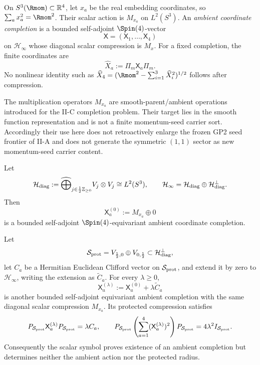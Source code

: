 \documentclass[12pt,a4paper]{article}
\begin{document}
\begin{definition}
\label{p2:def:xp-operators}
On \(S^3(\Rmom)\subset\mathbb R^4\), let \(x_a\) be the real embedding
coordinates, so \(\sum_a x_a^2=\Rmom^2\).  Their scalar action is
\(M_{x_a}\) on \(L^2(S^3)\).  An \emph{ambient coordinate completion} is a
bounded self-adjoint \(\Spin(4)\)-vector
\[
\mathsf X=(\mathsf X_1,\ldots,\mathsf X_4)
\]
on \(\mathcal H_\infty\) whose diagonal scalar compression is \(M_x\).
For a fixed completion, the finite coordinates are
\[
\widehat X_a:=\Pi_m\mathsf X_a\Pi_m.
\]
No nonlinear identity such as
\(\widehat X_4=(\Rmom^2-\sum_{i=1}^3\widehat X_i^2)^{1/2}\) follows after
compression.
\end{definition}

\begin{remark}
\label{p2c:rem:ambient-multiplication-seed-guard}
The multiplication operators \(M_{x_a}\) are smooth-parent/ambient operations
introduced for the II-C completion problem.  Their target lies in the smooth
function representation and is not a finite momentum-seed carrier sort.
Accordingly their use here does not retroactively enlarge the frozen GP2 seed
frontier of II-A and does not generate the symmetric \((1,1)\) sector as new
momentum-seed carrier content.
\end{remark}

\begin{proposition}
\label{p2:prop:ambient-completion-existence-nonuniqueness}
Let
\[
 \mathcal H_{\rm diag}
 :=
 \widehat{\bigoplus}_{j\in\frac12\mathbb Z_{\ge0}}
 V_j\otimes V_j
 \cong L^2(S^3),
 \qquad
 \mathcal H_\infty
 =
 \mathcal H_{\rm diag}\oplus\mathcal H_{\rm diag}^{\perp}.
\]
Then
\[
        \mathsf X_a^{(0)}:=M_{x_a}\oplus0
\]
is a bounded self-adjoint \(\Spin(4)\)-equivariant ambient coordinate
completion.

Let
\[
 \mathcal S_{\rm prot}
 =
 V_{\frac12,0}\oplus V_{0,\frac12}
 \subset\mathcal H_{\rm diag}^{\perp},
\]
let \(C_a\) be a Hermitian Euclidean Clifford vector on \(\mathcal S_{\rm prot}\), and
extend it by zero to \(\mathcal H_\infty\), writing the extension as
\(\widetilde C_a\).  For every \(\lambda\ge0\),
\[
        \mathsf X_a^{(\lambda)}
        :=
        \mathsf X_a^{(0)}+\lambda\widetilde C_a
\]
is another bounded self-adjoint equivariant ambient completion with the same
diagonal scalar compression \(M_{x_a}\).  Its protected compression satisfies
\[
 P_{\mathcal S_{\rm prot}}\mathsf X_a^{(\lambda)}P_{\mathcal S_{\rm prot}}
 =\lambda C_a,
 \qquad
 P_{\mathcal S_{\rm prot}}
 \left(\sum_{a=1}^4(\mathsf X_a^{(\lambda)})^2\right)
 P_{\mathcal S_{\rm prot}}
 =4\lambda^2 I_{\mathcal S_{\rm prot}}.
\]
Consequently the scalar symbol proves existence of an ambient completion but
determines neither the ambient action nor the protected radius.
\end{proposition}
\end{document}
